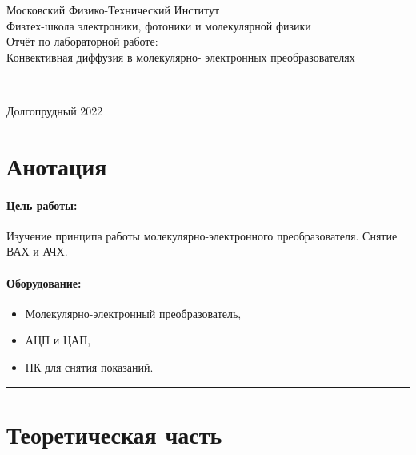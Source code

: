 \documentclass[a4paper,12pt]{article} %
\begin{document}



\begin{center}
{\LARGE Московский Физико-Технический Институт}
\\
{\large Физтех-школа электроники, фотоники и молекулярной физики }
\\
\vspace{8cm}
{\LARGE Отчёт по лабораторной работе:}
\\
{\Huge Конвективная диффузия в молекулярно- электронных преобразователях} 
\\
\vspace{5cm}
\raggedright 
\hspace{8cm}{\large Выполнил студент группы Б04-005}\\
\hspace{8cm}{\large Карташов Констанин}

\vspace{\fill}
\center
{\large Долгопрудный 2022}

\end{center}

\newpage


\section{Анотация}

\paragraph{Цель работы:} 
Изучение принципа работы молекулярно-электронного преобразователя. Снятие ВАХ и АЧХ.

\paragraph{Оборудование:}
\begin{itemize}
\renewcommand{\labelitemi}{$\triangleright$}
\itemsep0em
\item Молекулярно-электронный преобразователь,
\item АЦП и ЦАП,
\item ПК для снятия показаний.
\end{itemize}


\medskip\hrule\medskip

\section{Теоретическая часть}
\end{document}
